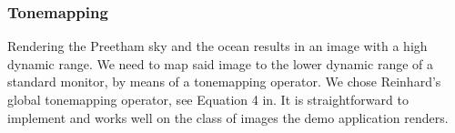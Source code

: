 



%
\subsubsection{Tonemapping}
Rendering the Preetham sky and the ocean results in an image with a high dynamic range.
We need to map said image to the lower dynamic range of a standard monitor, by means
of a tonemapping operator. We chose Reinhard's global tonemapping operator, see
Equation 4 in\cite{Reinhard:2002}. It is straightforward to implement and
works well on the class of images the demo application renders.

